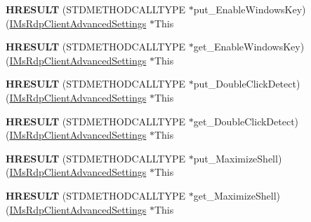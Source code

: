 \begin{DoxyCompactItemize}
{\bfseries H\+R\+E\+S\+U\+LT} (S\+T\+D\+M\+E\+T\+H\+O\+D\+C\+A\+L\+L\+T\+Y\+PE $\ast$put\+\_\+\+Enable\+Windows\+Key)(\hyperlink{interface_m_s_t_s_c_lib_1_1_i_ms_rdp_client_advanced_settings}{I\+Ms\+Rdp\+Client\+Advanced\+Settings} $\ast$This
\item 
\mbox{\label{struct_m_s_t_s_c_lib_1_1_i_ms_rdp_client_advanced_settings_vtbl_a2d3264015ed84c033e5a90e487af2129}} 
{\bfseries H\+R\+E\+S\+U\+LT} (S\+T\+D\+M\+E\+T\+H\+O\+D\+C\+A\+L\+L\+T\+Y\+PE $\ast$get\+\_\+\+Enable\+Windows\+Key)(\hyperlink{interface_m_s_t_s_c_lib_1_1_i_ms_rdp_client_advanced_settings}{I\+Ms\+Rdp\+Client\+Advanced\+Settings} $\ast$This
\item 
\mbox{\label{struct_m_s_t_s_c_lib_1_1_i_ms_rdp_client_advanced_settings_vtbl_a73bd46956ef35ca79bb31268bc3dfa5a}} 
{\bfseries H\+R\+E\+S\+U\+LT} (S\+T\+D\+M\+E\+T\+H\+O\+D\+C\+A\+L\+L\+T\+Y\+PE $\ast$put\+\_\+\+Double\+Click\+Detect)(\hyperlink{interface_m_s_t_s_c_lib_1_1_i_ms_rdp_client_advanced_settings}{I\+Ms\+Rdp\+Client\+Advanced\+Settings} $\ast$This
\item 
\mbox{\label{struct_m_s_t_s_c_lib_1_1_i_ms_rdp_client_advanced_settings_vtbl_a0c7d15511e36e1377e146d7305bae9c8}} 
{\bfseries H\+R\+E\+S\+U\+LT} (S\+T\+D\+M\+E\+T\+H\+O\+D\+C\+A\+L\+L\+T\+Y\+PE $\ast$get\+\_\+\+Double\+Click\+Detect)(\hyperlink{interface_m_s_t_s_c_lib_1_1_i_ms_rdp_client_advanced_settings}{I\+Ms\+Rdp\+Client\+Advanced\+Settings} $\ast$This
\item 
\mbox{\label{struct_m_s_t_s_c_lib_1_1_i_ms_rdp_client_advanced_settings_vtbl_ab532342a7820cdc4e3a5b30e000c602b}} 
{\bfseries H\+R\+E\+S\+U\+LT} (S\+T\+D\+M\+E\+T\+H\+O\+D\+C\+A\+L\+L\+T\+Y\+PE $\ast$put\+\_\+\+Maximize\+Shell)(\hyperlink{interface_m_s_t_s_c_lib_1_1_i_ms_rdp_client_advanced_settings}{I\+Ms\+Rdp\+Client\+Advanced\+Settings} $\ast$This
\item 
\mbox{\label{struct_m_s_t_s_c_lib_1_1_i_ms_rdp_client_advanced_settings_vtbl_a7178919e09e1ff2497d72798c56337e3}} 
{\bfseries H\+R\+E\+S\+U\+LT} (S\+T\+D\+M\+E\+T\+H\+O\+D\+C\+A\+L\+L\+T\+Y\+PE $\ast$get\+\_\+\+Maximize\+Shell)(\hyperlink{interface_m_s_t_s_c_lib_1_1_i_ms_rdp_client_advanced_settings}{I\+Ms\+Rdp\+Client\+Advanced\+Settings} $\ast$This

\end{DoxyCompactItemize}
